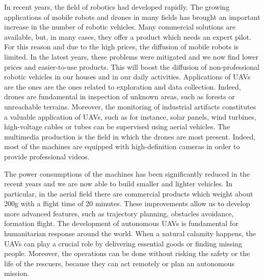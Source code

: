 


In recent years, the field of robotics had developed rapidly.
The growing applications of mobile robots and drones in many fields
has brought an important increase in the number of robotic vehicles.
Many commercial solutions are available, but, in many cases, they offer
a product which needs an expert pilot. For this reason and due to the high prices,
the diffusion of mobile robots is limited. In the latest years, these problems were
mitigated and we now find lower prices and easier-to-use products. This will boost
the diffusion of non-professional robotic vehicles in our houses and in our daily activities.
Applications of UAVs are the ones are the ones related to exploration and data
collection. Indeed, drones are fundamental in inspection of unknown areas, such as
forests or unreachable terrains.
Moreover, the monitoring of industrial artifacts constitutes a valuable application of UAVs,
such as for instance, solar panels, wind turbines, high-voltage cables or tubes can be
supervised using aerial vehicles.
The multimedia production is the field in which the drones are most present. Indeed,
most of the machines are equipped with high-definition cameras in order to provide
professional videos.

The power consumptions of the machines has been significantly reduced in the recent years
and we are now able to build smaller and lighter vehicles.
In particular, in the aerial field there are commercial products which weight
about 200g with a flight time of 20 minutes.
These improvements allow us to develop more advanced features, such as
trajectory planning, obstacles avoidance, formation flight.
The development of autonomous UAVs is fundamental for humanitarian
response around the world. When a natural calamity happens, the UAVs can play a
crucial role by delivering essential goods or finding missing people. Moreover, the
operations can be done without risking the safety or the life of the rescuers, because
they can act remotely or plan an autonomous mission.

